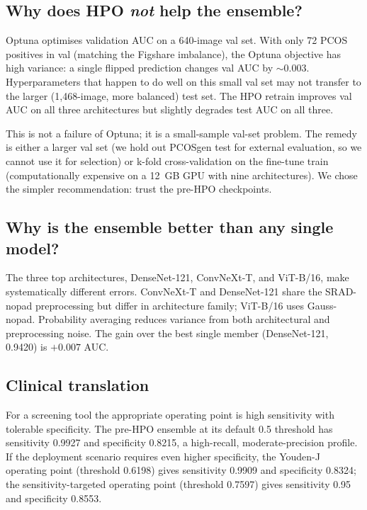 \documentclass[11pt,twocolumn]{article}
\newcommand{\PCOS}{PCOS}
\newcommand{\SRAD}{SRAD}
\newcommand{\AUC}{AUC}
\begin{document}
\subsection{Why does HPO \emph{not} help the ensemble?}

Optuna optimises validation \AUC{} on a 640-image val set. With only 72
\PCOS{} positives in val (matching the Figshare imbalance), the Optuna
objective has high variance: a single flipped prediction changes val
\AUC{} by $\sim$0.003. Hyperparameters that happen to do well on this
small val set may not transfer to the larger (1,468-image, more balanced)
test set. The HPO retrain improves val \AUC{} on all three architectures
but slightly degrades test \AUC{} on all three.

This is not a failure of Optuna; it is a small-sample val-set problem.
The remedy is either a larger val set (we hold out \PCOS{}gen test for
external evaluation, so we cannot use it for selection) or k-fold
cross-validation on the fine-tune train (computationally expensive on a
12~GB GPU with nine architectures). We chose the simpler recommendation:
trust the pre-HPO checkpoints.

\subsection{Why is the ensemble better than any single model?}

The three top architectures, DenseNet-121, ConvNeXt-T, and ViT-B/16, make
systematically different errors. ConvNeXt-T and DenseNet-121 share the
\SRAD{}-nopad preprocessing but differ in architecture family; ViT-B/16
uses Gauss-nopad. Probability averaging reduces variance from both
architectural and preprocessing noise. The gain over the best single
member (DenseNet-121, 0.9420) is $+0.007$ \AUC{}.

\subsection{Clinical translation}

For a screening tool the appropriate operating point is high sensitivity
with tolerable specificity. The pre-HPO ensemble at its default 0.5
threshold has sensitivity 0.9927 and specificity 0.8215, a
high-recall, moderate-precision profile. If the deployment scenario
requires even higher specificity, the Youden-J operating point (threshold
0.6198) gives sensitivity 0.9909 and specificity 0.8324; the
sensitivity-targeted operating point (threshold 0.7597) gives sensitivity
0.95 and specificity 0.8553.
\end{document}
